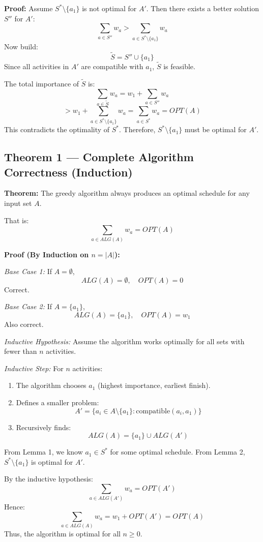 \documentclass[conference]{IEEEtran}
\begin{document}
\textbf{Proof:}
Assume \( S^* \setminus \{a_1\} \) is not optimal for \( A' \).  
Then there exists a better solution \( S'' \) for \( A' \):
\[
\sum_{a \in S''} w_a > \sum_{a \in S^* \setminus \{a_1\}} w_a
\]
Now build:
\[
\tilde{S} = S'' \cup \{a_1\}
\]
Since all activities in \( A' \) are compatible with \( a_1 \), \( \tilde{S} \) is feasible.

The total importance of \( \tilde{S} \) is:
\[
\sum_{a \in \tilde{S}} w_a = w_1 + \sum_{a \in S''} w_a
\]
\[
> w_1 + \sum_{a \in S^* \setminus \{a_1\}} w_a = \sum_{a \in S^*} w_a = OPT(A)
\]
This contradicts the optimality of \( S^* \).  
Therefore, \( S^* \setminus \{a_1\} \) must be optimal for \( A' \).  

\subsection{Theorem 1 — Complete Algorithm Correctness (Induction)}

\textbf{Theorem:}  
The greedy algorithm always produces an optimal schedule for any input set \( A \).

That is:
\[
\sum_{a \in ALG(A)} w_a = OPT(A)
\]

\textbf{Proof (By Induction on \( n = |A| \)):}

\textit{Base Case 1:}  
If \( A = \emptyset \),
\[
ALG(A) = \emptyset, \quad OPT(A) = 0
\]
Correct.

\textit{Base Case 2:}  
If \( A = \{a_1\} \),
\[
ALG(A) = \{a_1\}, \quad OPT(A) = w_1
\]
Also correct.  

\textit{Inductive Hypothesis:}  
Assume the algorithm works optimally for all sets with fewer than \( n \) activities.

\textit{Inductive Step:}  
For \( n \) activities:
\begin{enumerate}
    \item The algorithm chooses \( a_1 \) (highest importance, earliest finish).
    \item Defines a smaller problem:
    \[
    A' = \{ a_i \in A \setminus \{a_1\} : \text{compatible}(a_i, a_1) \}
    \]
    \item Recursively finds:
    \[
    ALG(A) = \{a_1\} \cup ALG(A')
    \]
\end{enumerate}

From Lemma 1, we know \( a_1 \in S^* \) for some optimal schedule.  
From Lemma 2, \( S^* \setminus \{a_1\} \) is optimal for \( A' \).

By the inductive hypothesis:
\[
\sum_{a \in ALG(A')} w_a = OPT(A')
\]
Hence:
\[
\sum_{a \in ALG(A)} w_a = w_1 + OPT(A') = OPT(A)
\]
Thus, the algorithm is optimal for all \( n \ge 0 \).  
\end{document}
